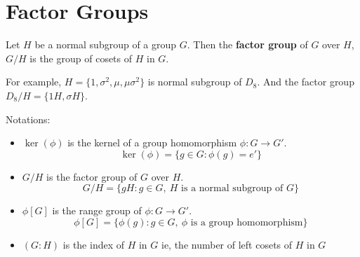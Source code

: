 \section{Factor Groups}%
\begin{remark}
	Let $H$ be a normal subgroup of a group $G$. Then the \textbf{factor group} of $G$ over $H$, $G/H$ is the group of cosets of $H$ in $G$.
\end{remark}

\begin{remark}
	For example, $H = \{ 1,\sigma^2,\mu,\mu\sigma^2 \}$ is normal subgroup of $D_8$. And the factor group $D_8/H = \{ 1H,\sigma H \}$.
\end{remark}

\begin{remark}Notations:
	\begin{itemize}
		\item $\ker(\phi)$ is the kernel of a group homomorphism $\phi : G \to G'$.
			$$\ker(\phi) = \{ g \in G : \phi(g) = e' \}$$
		\item $G/H$ is the factor group of $G$ over $H$.
			$$G/H = \{ gH : g \in G,\ H \text{ is a normal subgroup of } G\}$$
		\item $\phi[G]$ is the range group of $\phi: G \to G'$.
			$$\phi[G] = \{ \phi(g) : g \in G,\ \phi \text{ is a group homomorphism} \}$$
		\item $(G:H)$ is the index of $H$ in $G$ ie, the number of left cosets of $H$ in $G$ %
	\end{itemize}
\end{remark}

